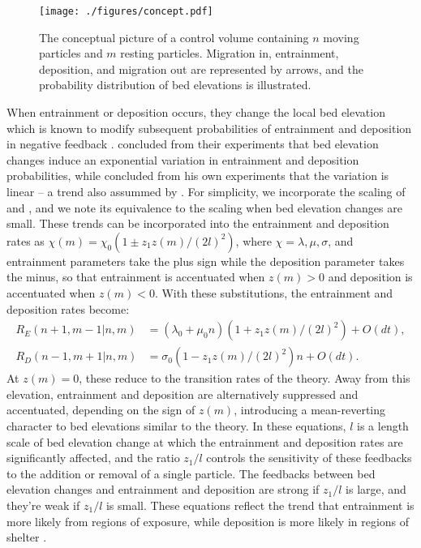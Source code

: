 \documentclass[draft]{agujournal2018}
\begin{document}
\begin{figure}
  \texttt{[image: ./figures/concept.pdf]}
  \caption{The conceptual picture of a control volume containing $n$ moving particles and $m$ resting particles. Migration in, entrainment, deposition, and migration out are represented by arrows, and the probability distribution of bed elevations is illustrated.}
  \label{fig:concept}
\vspace{-1.0cm}
\end{figure}

When entrainment or deposition occurs, they change the local bed elevation which is known to modify subsequent probabilities of entrainment and deposition in negative feedback \citep{Sawai1987, Wong2007}.
\citet{Wong2007} concluded from their experiments that bed elevation changes induce an exponential variation in entrainment and deposition probabilities, while \citet{Sawai1987} concluded from his own experiments that the variation is linear -- a trend also assummed by \citet{Martin2014}.
For simplicity, we incorporate the scaling of \citet{Sawai1987} and \citet{Martin2014}, and we note its equivalence to the \citet{Wong2007} scaling when bed elevation changes are small.
These trends can be incorporated into the entrainment and deposition rates as $\chi(m) = \chi_0(1\pm z_1 z(m)/(2l)^2)$, where $\chi = \lambda, \mu, \sigma$, and entrainment parameters take the plus sign while the deposition parameter takes the minus, so that entrainment is accentuated when $z(m)>0$ and deposition is accentuated when $z(m)<0$. 
With these substitutions, the entrainment and deposition rates become:
\begin{align}
R_E(n+1,m-1| n,m)  &= (\lambda_0 + \mu_0 n)(1 + z_1z(m)/(2l)^2) + O(dt),\\
R_D(n-1,m+1| n,m) &= \sigma_0 (1-z_1z(m)/(2l)^2)n + O(dt).
\end{align} 
At $z(m)=0$, these reduce to the transition rates of the \citet{Ancey2008} theory.
Away from this elevation, entrainment and deposition are alternatively suppressed and accentuated, depending on the sign of $z(m)$, introducing a mean-reverting character to bed elevations similar to the \citet{Martin2014} theory. 
In these equations, $l$ is a length scale of bed elevation change at which the entrainment and deposition rates are significantly affected, and the ratio $z_1/l$ controls the sensitivity of these feedbacks to the addition or removal of a single particle.
The feedbacks between bed elevation changes and entrainment and deposition are strong if $z_1/l$ is large, and they're weak if $z_1/l$ is small.
These equations reflect the trend that entrainment is more likely from regions of exposure, while deposition is more likely in regions of shelter \citep[e.g.][]{Wong2007}.
\end{document}
